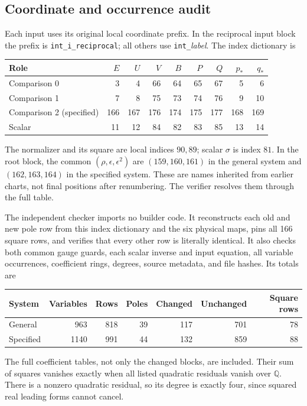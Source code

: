 \documentclass[11pt]{article}
\newcommand{\Q}{\mathbb Q}
\begin{document}
\subsection{Coordinate and occurrence audit}

Each input uses its original local coordinate prefix. In the
reciprocal input block the prefix is \texttt{int\_i\_reciprocal};
all others use \texttt{int\_}\emph{label}. The index dictionary is
\begin{center}\small
\begin{tabular}{@{}lrrrrrrrr@{}}
\toprule
Role & $E$ & $U$ & $V$ & $B$ & $P$ & $Q$ & $p_*$ & $q_*$\\
\midrule
Comparison 0 & 3&4&66&64&65&67&5&6\\
Comparison 1 & 7&8&75&73&74&76&9&10\\
Comparison 2 (specified) &166&167&176&174&175&177&168&169\\
Scalar &11&12&84&82&83&85&13&14\\
\bottomrule
\end{tabular}
\end{center}
The normalizer and its square are local indices $90,89$; scalar
$\sigma$ is index $81$. In the root block, the common
$(\rho,\epsilon,\epsilon^2)$ are $(159,160,161)$ in the general
system and $(162,163,164)$ in the specified system. These are
names inherited from earlier charts, not final positions after
renumbering. The verifier resolves them through the full table.

The independent checker imports no builder code. It reconstructs
each old and new pole row from this index dictionary and the six
physical maps, pins all 166 square rows, and verifies that every
other row is literally identical. It also checks both common
gauge guards, each scalar inverse and input equation, all variable
occurrences, coefficient rings, degrees, source metadata, and
file hashes. Its totals are
\begin{center}
\begin{tabular}{@{}lrrrrrr@{}}
\toprule
System & Variables & Rows & Poles & Changed & Unchanged & Square rows\\
\midrule
General &963&818&39&117&701&78\\
Specified &1140&991&44&132&859&88\\
\bottomrule
\end{tabular}
\end{center}
The full coefficient tables, not only the changed blocks, are
included. Their sum of squares vanishes exactly when all listed
quadratic residuals vanish over $\Q$. There is a nonzero quadratic
residual, so its degree is exactly four, since squared real leading
forms cannot cancel.
\end{document}
